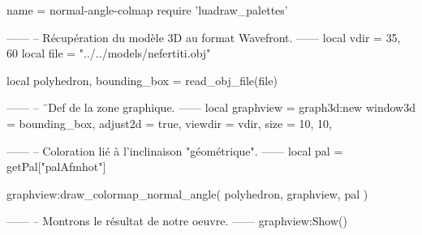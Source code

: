 \documentclass{standalone}
\begin{document}
\begin{luadraw}{name = normal-angle-colmap}
require 'luadraw_palettes'

------
-- Récupération du modèle 3D au format Wavefront.
------
local vdir = {35, 60}
local file = "../../models/nefertiti.obj"

local polyhedron, bounding_box = read_obj_file(file)


------
-- ¨Def de la zone graphique.
------
local graphview = graph3d:new{
  window3d = bounding_box,
  adjust2d = true,
  viewdir  = vdir,
  size     = {10, 10},
}

------
-- Coloration lié à l'inclinaison "géométrique".
------
local pal = getPal["palAfmhot"]

graphview:draw_colormap_normal_angle(
  polyhedron,
  graphview,
  pal
)

------
-- Montrons le résultat de notre oeuvre.
------
graphview:Show()
\end{luadraw}
\end{document}
